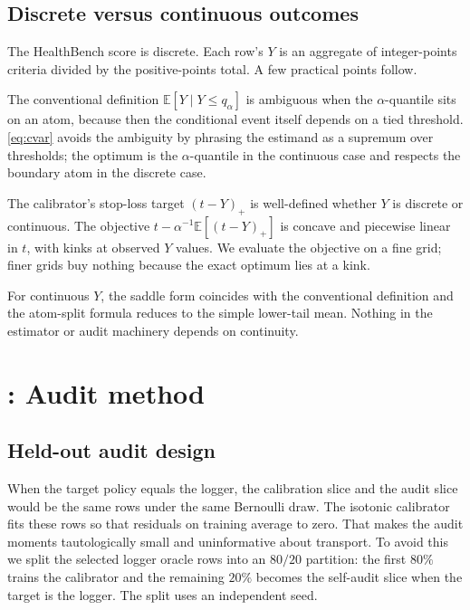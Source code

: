 \documentclass[11pt]{article}
\newcommand{\E}{\mathbb{E}}
\begin{document}
\subsection{Discrete versus continuous outcomes}
\label{app:discrete}

The HealthBench score is discrete. Each row's $Y$ is an aggregate of
integer-points criteria divided by the positive-points total. A few
practical points follow.

The conventional definition $\E[Y \mid Y \le q_\alpha]$ is ambiguous
when the $\alpha$-quantile sits on an atom, because then the conditional
event itself depends on a tied threshold. \eqref{eq:cvar} avoids the
ambiguity by phrasing the estimand as a supremum over thresholds; the
optimum is the $\alpha$-quantile in the continuous case and respects
the boundary atom in the discrete case.

The calibrator's stop-loss target $(t - Y)_+$ is well-defined whether
$Y$ is discrete or continuous. The objective $t - \alpha^{-1}\E[(t -
Y)_+]$ is concave and piecewise linear in $t$, with kinks at observed
$Y$ values. We evaluate the objective on a fine grid; finer grids buy
nothing because the exact optimum lies at a kink.

For continuous $Y$, the saddle form coincides with the conventional
definition and the atom-split formula reduces to the simple lower-tail
mean. Nothing in the estimator or audit machinery depends on
continuity.

\section{: Audit method}
\label{app:audit-method}

\subsection{Held-out audit design}
\label{app:holdout}

When the target policy equals the logger, the calibration slice and
the audit slice would be the same rows under the same Bernoulli draw.
The isotonic calibrator fits these rows so that residuals on training
average to zero. That makes the audit moments tautologically small and
uninformative about transport. To avoid this we split the selected
logger oracle rows into an $80/20$ partition: the first $80\%$ trains
the calibrator and the remaining $20\%$ becomes the self-audit slice
when the target is the logger. The split uses an independent seed.
\end{document}
